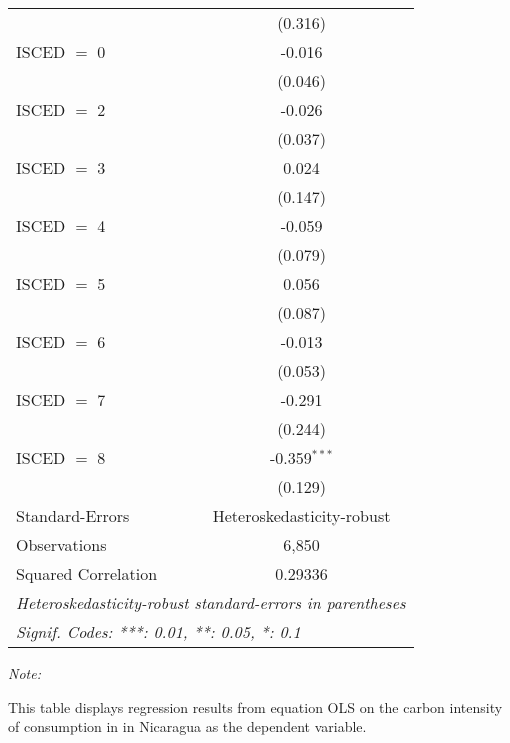 \begin{table}[htbp!]
\begin{adjustbox}{width = 1\textwidth, max height = 0.95\textheight, center}
\begin{threeparttable}[b]
\begin{tabular}{lc}
                                & (0.316)\\   
            ISCED $=$ 0         & -0.016\\   
                                & (0.046)\\   
            ISCED $=$ 2         & -0.026\\   
                                & (0.037)\\   
            ISCED $=$ 3         & 0.024\\   
                                & (0.147)\\   
            ISCED $=$ 4         & -0.059\\   
                                & (0.079)\\   
            ISCED $=$ 5         & 0.056\\   
                                & (0.087)\\   
            ISCED $=$ 6         & -0.013\\   
                                & (0.053)\\   
            ISCED $=$ 7         & -0.291\\   
                                & (0.244)\\   
            ISCED $=$ 8         & -0.359$^{***}$\\   
                                & (0.129)\\   
            \midrule 
            Standard-Errors     & Heteroskedasticity-robust \\   
            Observations        & 6,850\\  
            Squared Correlation & 0.29336\\  
            \midrule \midrule
            \multicolumn{2}{l}{\emph{Heteroskedasticity-robust standard-errors in parentheses}}\\
            \multicolumn{2}{l}{\emph{Signif. Codes: ***: 0.01, **: 0.05, *: 0.1}}\\
         \end{tabular}
         
         \begin{tablenotes}\item \medskip \textit{Note:}
            \item This table displays regression results from equation OLS on the carbon intensity of consumption in  in Nicaragua as the dependent variable. 
         \end{tablenotes}
      \end{threeparttable}
   \end{adjustbox}
\end{table}



